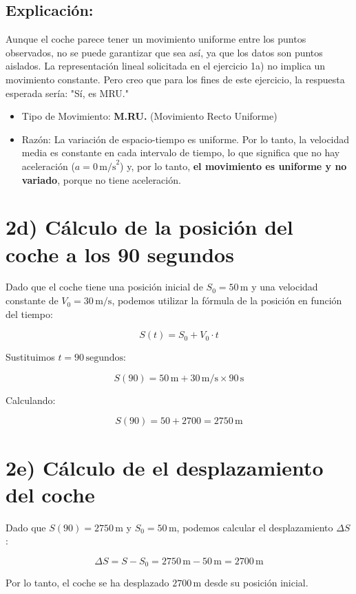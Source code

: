 \documentclass{article}
\begin{document}
\subsection*{Explicación:}

Aunque el coche parece tener un movimiento uniforme entre los puntos observados, no se puede garantizar que sea así, ya que los datos son puntos aislados. La representación lineal solicitada en el ejercicio 1a) no implica un movimiento constante.
Pero creo que para los fines de este ejercicio, la respuesta esperada sería: "Sí, es MRU."

\begin{itemize}
    \item Tipo de Movimiento: \textbf{M.RU.} (Movimiento Recto Uniforme)
    \item Razón: La variación de espacio-tiempo es uniforme. Por lo tanto, la velocidad media es constante en cada intervalo de tiempo, lo que significa que no hay aceleración (\(a = 0 \, \text{m/s}^2\)) y, por lo tanto, \textbf{el movimiento es uniforme y no variado}, porque no tiene aceleración. 
\end{itemize}


\section*{2d) Cálculo de la posición del coche a los 90 segundos}

Dado que el coche tiene una posición inicial de \(S_0 = 50 \, \text{m}\) y una velocidad constante de \(V_0 = 30 \, \text{m/s}\), podemos utilizar la fórmula de la posición en función del tiempo:

\[
S(t) = S_0 + V_0 \cdot t
\]

Sustituimos \(t = 90 \, \text{segundos}\):

\[
S(90) = 50 \, \text{m} + 30 \, \text{m/s} \times 90 \, \text{s}
\]

Calculando:

\[
S(90) = 50 + 2700 = \boxed{2750 \, \text{m}}
\]


\section*{2e) Cálculo de el desplazamiento del coche}

Dado que \( S(90) = 2750 \, \text{m} \) y \( S_0 = 50 \, \text{m} \), podemos calcular el desplazamiento \(\Delta S\):

\[
\Delta S = S - S_0 = 2750 \, \text{m} - 50 \, \text{m} = \boxed{2700 \, \text{m}}
\]

\justify
Por lo tanto, el coche se ha desplazado \( 2700 \, \text{m} \) desde su posición inicial.
\end{document}
